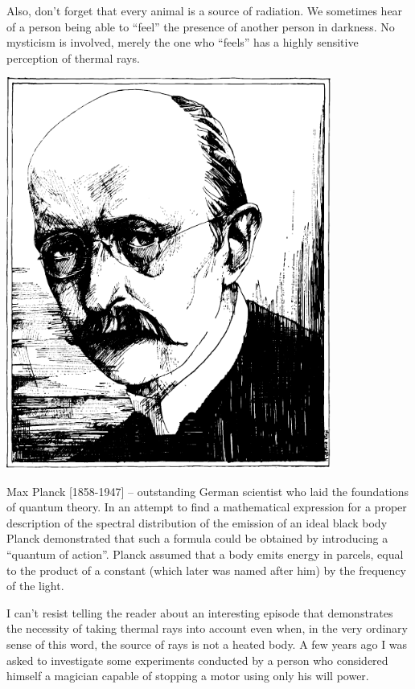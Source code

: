 Also, don't forget that every animal is a source of radiation. We sometimes hear of a person being able to ``feel'' the presence of another person in darkness. No mysticism is involved, merely the one who ``feels'' has a highly sensitive perception of thermal rays.


\begin{center}
\includegraphics[width=0.8\textwidth]{figures/planck.pdf}
\end{center}
{\small \textsf{{Max Planck [1858-1947]}} -- \textsf{\footnotesize outstanding German scientist who laid the foundations of quantum theory. In an attempt to find a mathematical expression for a proper description of the spectral distribution of the emission of an ideal black body Planck demonstrated that such a formula could be obtained by introducing a ``quantum of action''. Planck assumed that a body emits energy in parcels, equal to the product of a constant (which later was named after him) by the frequency of the light.}}



I can't resist telling the reader about an interesting episode that demonstrates the necessity of taking thermal rays into account even when, in the very ordinary sense of this word, the source of rays is not a heated body. A few years ago I was asked to investigate some experiments conducted by a person who considered himself a magician capable of stopping a motor using only his will power.

